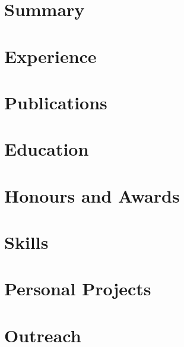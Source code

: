 \documentclass[english,a4paper,10pt]{extarticle}
\begin{document}
\pagestyle{normal_page}
\thispagestyle{first_page}

\section{Summary}


\section{Experience}


\section{Publications}


\section{Education}


\section{Honours and Awards}


\section{Skills}


\section{Personal Projects}


\section{Outreach}


\thispagestyle{last_page}

\end{document}
